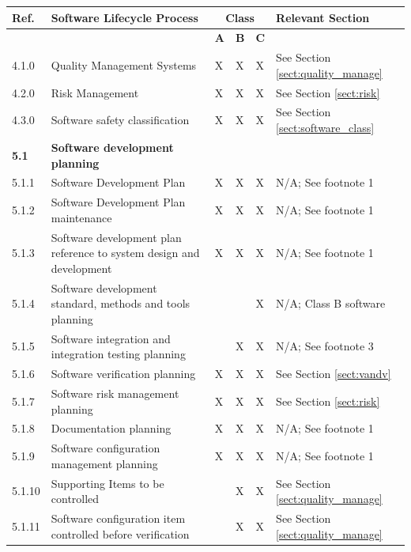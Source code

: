\documentclass[]{article}
\begin{document}
\begin{center}
	\begin{longtable}{ |p{1.3cm}| p{5.5cm}| p{0.7cm}| p{0.7cm}| p{0.7cm}| p{3.5cm}| }
	\hline
	\rowcolor{blue!25} \textbf{Ref.} & \textbf{Software Lifecycle Process} & \multicolumn{3}{c|}{\textbf{Class}} & \textbf{Relevant Section}  \\ \hline
	\rowcolor{blue!25} &  & \textbf{A} & \textbf{B} & \textbf{C} &  \\ \hline
	4.1.0 & Quality Management Systems & X & X & X & See Section \ref{sect:quality_manage}  \\ \hline
	4.2.0 & Risk Management & X & X & X & See Section \ref{sect:risk} \\ \hline
	4.3.0 & Software safety classification  & X & X & X & See Section \ref{sect:software_class} \\ \hline
	
	
	\rowcolor{blue!25} \textbf{5.1} & \textbf{Software development planning} &  & & & \\ \hline
	5.1.1 & Software Development Plan & X & X & X & N/A; See footnote 1 \\ \hline
	5.1.2 & Software Development Plan maintenance & X & X & X & N/A; See footnote 1 \\ \hline
	5.1.3 & Software development plan reference to system design and development & X & X & X & N/A; See footnote 1 \\ \hline
	5.1.4 & Software development standard, methods and tools planning &  &   & X & N/A; Class B software \\ \hline
	5.1.5 & Software integration and integration testing planning &  & X & X & N/A; See footnote 3  \\ \hline
	5.1.6 & Software verification planning & X & X & X &  See Section \ref{sect:vandv} \\ \hline
	5.1.7 & Software risk management planning & X & X & X & See Section \ref{sect:risk} \\ \hline
	5.1.8 & Documentation planning & X & X & X & N/A; See footnote 1 \\ \hline
	5.1.9 & Software configuration management planning & X & X & X & N/A; See footnote 1  \\ \hline
	5.1.10 & Supporting Items to be controlled &   & X & X & See Section \ref{sect:quality_manage} \\ \hline
	5.1.11 & Software configuration item controlled before verification &  & X & X & See Section \ref{sect:quality_manage} \\ \hline
	

\end{longtable}
\end{center}
\end{document}
